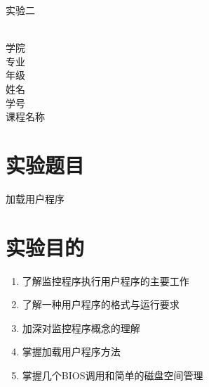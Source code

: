 \documentclass[12pt]{article}
\begin{document}
    \begin{titlepage}
        \heiti
        \vspace*{64pt}
        \begin{center}
            \fontsize{72pt}{0} 实验二\\
            \vspace*{36pt}
            \\
            \vspace*{48pt}
    
            \vspace*{48pt}
        
            \LARGE 学院\ \ \underline{}\\
            \LARGE 专业\ \ \underline{}\\
			 \LARGE 年级\ \ \underline{}\\
			 \LARGE 姓名\ \ \underline{}\\
			\LARGE 学号\ \ \underline{}\\
			\LARGE 课程名称\ \ \underline{}\\
            \vspace*{72pt}
        \end{center}
    \end{titlepage}

\newpage

\tableofcontents   %
\newpage


\section{\LARGE 实验题目}
\large 加载用户程序


\section{\LARGE 实验目的}
\begin{enumerate}
\item 了解监控程序执行用户程序的主要工作
\item 了解一种用户程序的格式与运行要求
\item 加深对监控程序概念的理解
\item 掌握加载用户程序方法
\item 掌握几个BIOS调用和简单的磁盘空间管理
\end{enumerate}
\end{document}
